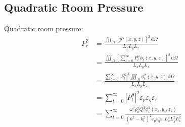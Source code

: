 \documentclass[a4paper,UTF8]{ctexart}
\begin{document}
	
	\subsection{Quadratic Room Pressure}
	Quadratic room pressure:
	\begin{equation}
	\label{eq:QuadraticRoomPressure}
	\begin{split}
	P_r^2
	&= \frac{\iiint_\Omega
		\left[p^\mathrm{S}\left(x,y,z\right)\right]^2
		\,\mathrm d\Omega }
	{L_xL_yL_z}\\
	&= \frac{\iiint_\Omega
		\left[\sum_{t=0}^{\infty}P_t^\mathrm{S}\phi_t\left(x,y,z\right)\right]^2
		\,\mathrm d\Omega }
	{L_xL_yL_z}\\
	&= \frac{\sum_{t=0}^{\infty}\left\lvert P_t^\mathrm{S}\right\rvert^2
		\iiint_\Omega\phi_t^2\left(x,y,z\right)\,\mathrm d\Omega }
	{L_xL_yL_z}\\
	&= \sum_{t=0}^{\infty}\left\lvert P_t^\mathrm{S}
		\right\rvert^2\varepsilon_p\varepsilon_q\varepsilon_r\\
	 &= \sum_{t=0}^{\infty} 
	 \frac{ \omega^2 \rho_0^2 Q^2 \phi_t^2 \left( x_s,y_s,z_s\right)}
	 {\left(k^2-k_t^2 \right)^2 
	 	\varepsilon_p\varepsilon_q\varepsilon_r L_x^2 L_y^2 L_z^2 }
	\end{split}
	\end{equation}
	
\end{document}
